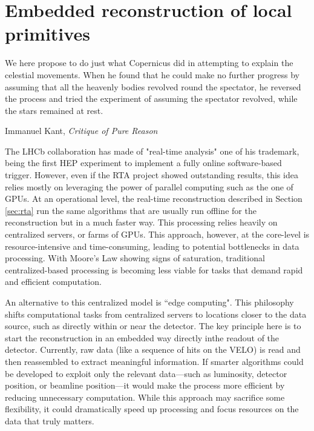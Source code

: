 
\chapter{Embedded reconstruction of local primitives}
\label{chp:retina}
\epigraph{We here propose to do just what Copernicus did in attempting to explain the celestial movements. When he found that he could make no further progress by assuming that all the heavenly bodies revolved round the spectator, he reversed the process and tried the experiment of assuming the spectator revolved, while the stars remained at rest.}{Immanuel Kant, \textit{Critique of Pure Reason}}

The LHCb collaboration has made of "real-time analysis" one of his trademark, being the first HEP experiment to implement a fully online software-based trigger. However, even if the RTA project showed outstanding results, this idea relies mostly on leveraging the power of parallel computing such as the one of GPUs. 
At an operational level, the real-time reconstruction described in Section \ref{sec:rta} run the same algorithms that are usually run offline for the reconstruction but in a much faster way. This processing relies heavily on centralized servers, or farms of GPUs. This approach, however, at the core-level is resource-intensive and time-consuming, leading to potential bottlenecks in data processing. With Moore's Law showing signs of saturation, traditional centralized-based processing is becoming less viable for tasks that demand rapid and efficient computation.

An alternative to this centralized model is ``edge computing". This philosophy shifts computational tasks from centralized servers to locations closer to the data source, such as directly within or near the detector. The key principle here is to start the reconstruction in an embedded way directly inthe readout of the detector. Currently, raw data (like a sequence of hits on the VELO) is read and then reassembled to extract meaningful information. If smarter algorithms could be developed to exploit only the relevant data—such as luminosity, detector position, or beamline position—it would make the process more efficient by reducing unnecessary computation. While this approach may sacrifice some flexibility, it could dramatically speed up processing and focus resources on the data that truly matters.

